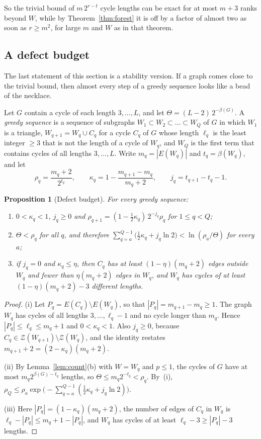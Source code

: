 \documentclass[11pt]{article}
\newtheorem{proposition}[theorem]{Proposition}
\theoremstyle{definition}
\theoremstyle{remark}
\newcommand{\Z}{\mathcal{Z}}
\newcommand{\sm}{\setminus}
\newcommand{\half}{\tfrac12}
\begin{document}
So the trivial bound of $m\,2^{r-t}$ cycle lengths can be exact for at most $m+3$ ranks beyond
$W$, while by Theorem~\ref{thm:forest} it is off by a factor of almost two as soon as $r\ge m^{2}$,
for large $m$ and $W$ as in that theorem.

\subsection{A defect budget}

The last statement of this section is a stability version. If a graph comes close to the trivial
bound, then almost every step of a greedy sequence looks like a bead of the necklace.

Let $G$ contain a cycle of each length $3,\dots,L$, and let $\Theta=(L-2)\,2^{-\beta(G)}$. A
\emph{greedy sequence} is a sequence of subgraphs $W_1\subset W_2\subset\dots\subset W_Q$ of $G$ in
which $W_1$ is a triangle, $W_{q+1}=W_q\cup C_q$ for a cycle $C_q$ of $G$ whose length $\ell_q$ is
the least integer $\ge3$ that is not the length of a cycle of $W_q$, and $W_Q$ is the first term
that contains cycles of all lengths $3,\dots,L$. Write $m_q=|E(W_q)|$ and $t_q=\beta(W_q)$, and let
\[
  \rho_q=\frac{m_q+2}{2^{t_q}},\qquad
  \kappa_q=1-\frac{m_{q+1}-m_q}{m_q+2},\qquad
  j_q=t_{q+1}-t_q-1 .
\]

\begin{proposition}[Defect budget]\label{prop:defect}
For every greedy sequence:
\begin{enumerate}
\item[\textup{(i)}] $0<\kappa_q<1$, $j_q\ge0$ and $\rho_{q+1}=(1-\half\kappa_q)\,2^{-j_q}\rho_q$ for
$1\le q<Q$;
\item[\textup{(ii)}] $\Theta<\rho_q$ for all $q$, and therefore
$\sum_{q=a}^{Q-1}\bigl(\half\kappa_q+j_q\ln2\bigr)<\ln(\rho_a/\Theta)$ for every $a$;
\item[\textup{(iii)}] if $j_q=0$ and $\kappa_q\le\eta$, then $C_q$ has at least $(1-\eta)(m_q+2)$
edges outside $W_q$ and fewer than $\eta(m_q+2)$ edges in $W_q$, and $W_q$ has cycles of at least
$(1-\eta)(m_q+2)-3$ different lengths.
\end{enumerate}
\end{proposition}

\begin{proof}
(i) Let $P_q=E(C_q)\sm E(W_q)$, so that $|P_q|=m_{q+1}-m_q\ge1$. The graph $W_q$ has cycles of all
lengths $3,\dots,\ell_q-1$ and no cycle longer than $m_q$. Hence $|P_q|\le\ell_q\le m_q+1$ and
$0<\kappa_q<1$. Also $j_q\ge0$, because $C_q\in\Z(W_{q+1})\sm\Z(W_q)$, and the identity restates
$m_{q+1}+2=(2-\kappa_q)(m_q+2)$.

(ii) By Lemma~\ref{lem:count}(b) with $W=W_q$ and $p\le1$, the cycles of $G$ have at most
$m_q2^{\beta(G)-t_q}$ lengths, so $\Theta\le m_q2^{-t_q}<\rho_q$. By~(i),
$\rho_Q\le\rho_a\exp\bigl(-\sum_{q=a}^{Q-1}(\half\kappa_q+j_q\ln2)\bigr)$.

(iii) Here $|P_q|=(1-\kappa_q)(m_q+2)$, the number of edges of $C_q$ in $W_q$ is
$\ell_q-|P_q|\le m_q+1-|P_q|$, and $W_q$ has cycles of at least $\ell_q-3\ge|P_q|-3$ lengths.
\end{proof}
\end{document}
